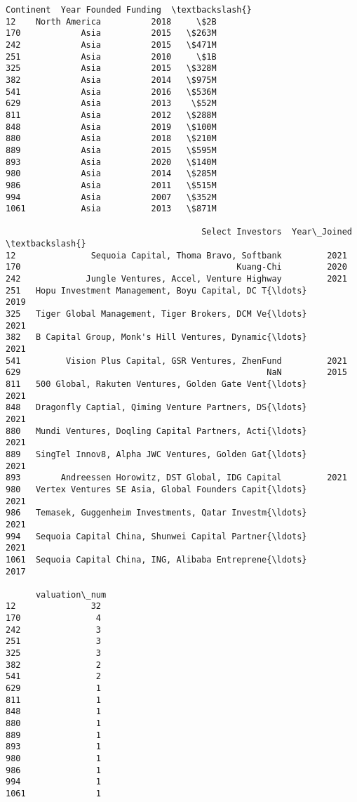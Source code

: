 \documentclass[11pt]{article}
\begin{document}
\begin{tcolorbox}[breakable, size=fbox, boxrule=.5pt, pad at break*=1mm, opacityfill=0]
\begin{Verbatim}[commandchars=\\\{\}]
          Continent  Year Founded Funding  \textbackslash{}
12    North America          2018     \$2B
170            Asia          2015   \$263M
242            Asia          2015   \$471M
251            Asia          2010     \$1B
325            Asia          2015   \$328M
382            Asia          2014   \$975M
541            Asia          2016   \$536M
629            Asia          2013    \$52M
811            Asia          2012   \$288M
848            Asia          2019   \$100M
880            Asia          2018   \$210M
889            Asia          2015   \$595M
893            Asia          2020   \$140M
980            Asia          2014   \$285M
986            Asia          2011   \$515M
994            Asia          2007   \$352M
1061           Asia          2013   \$871M

                                       Select Investors  Year\_Joined  \textbackslash{}
12               Sequoia Capital, Thoma Bravo, Softbank         2021
170                                           Kuang-Chi         2020
242             Jungle Ventures, Accel, Venture Highway         2021
251   Hopu Investment Management, Boyu Capital, DC T{\ldots}         2019
325   Tiger Global Management, Tiger Brokers, DCM Ve{\ldots}         2021
382   B Capital Group, Monk's Hill Ventures, Dynamic{\ldots}         2021
541         Vision Plus Capital, GSR Ventures, ZhenFund         2021
629                                                 NaN         2015
811   500 Global, Rakuten Ventures, Golden Gate Vent{\ldots}         2021
848   Dragonfly Captial, Qiming Venture Partners, DS{\ldots}         2021
880   Mundi Ventures, Doqling Capital Partners, Acti{\ldots}         2021
889   SingTel Innov8, Alpha JWC Ventures, Golden Gat{\ldots}         2021
893        Andreessen Horowitz, DST Global, IDG Capital         2021
980   Vertex Ventures SE Asia, Global Founders Capit{\ldots}         2021
986   Temasek, Guggenheim Investments, Qatar Investm{\ldots}         2021
994   Sequoia Capital China, Shunwei Capital Partner{\ldots}         2021
1061  Sequoia Capital China, ING, Alibaba Entreprene{\ldots}         2017

      valuation\_num
12               32
170               4
242               3
251               3
325               3
382               2
541               2
629               1
811               1
848               1
880               1
889               1
893               1
980               1
986               1
994               1
1061              1
\end{Verbatim}
\end{tcolorbox}
        
\end{document}
